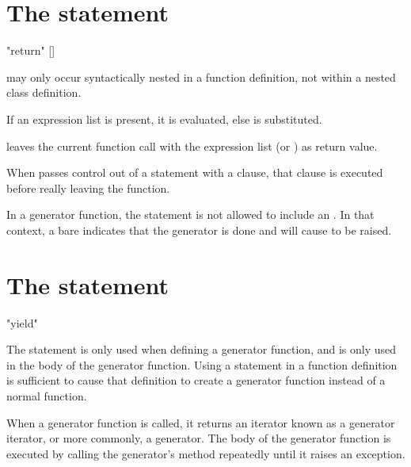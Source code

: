 \section{The  statement \label{return}}

\begin{productionlist}
             {"return" []}
\end{productionlist}

 may only occur syntactically nested in a function
definition, not within a nested class definition.

If an expression list is present, it is evaluated, else 
is substituted.

 leaves the current function call with the expression
list (or ) as return value.

When  passes control out of a  statement
with a  clause, that  clause is executed
before really leaving the function.

In a generator function, the  statement is not allowed
to include an .  In that context, a bare
 indicates that the generator is done and will cause
 to be raised.


\section{The  statement \label{yield}}

\begin{productionlist}
             {"yield" }
\end{productionlist}


The  statement is only used when defining a generator
function, and is only used in the body of the generator function.
Using a  statement in a function definition is
sufficient to cause that definition to create a generator function
instead of a normal function.

When a generator function is called, it returns an iterator known as a
generator iterator, or more commonly, a generator.  The body of the
generator function is executed by calling the generator's
 method repeatedly until it raises an exception.

